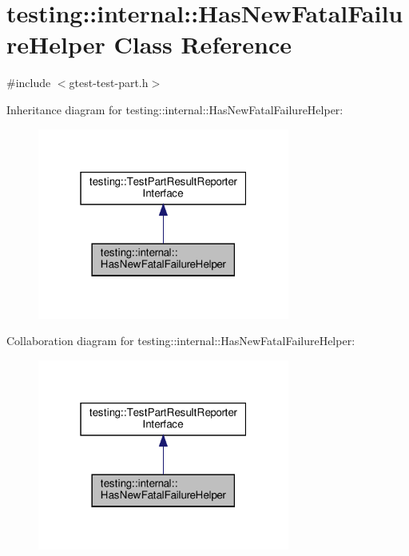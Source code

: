 \hypertarget{classtesting_1_1internal_1_1_has_new_fatal_failure_helper}{}\section{testing\+:\+:internal\+:\+:Has\+New\+Fatal\+Failure\+Helper Class Reference}
\label{classtesting_1_1internal_1_1_has_new_fatal_failure_helper}


{\ttfamily \#include $<$gtest-\/test-\/part.\+h$>$}



Inheritance diagram for testing\+:\+:internal\+:\+:Has\+New\+Fatal\+Failure\+Helper\+:
\nopagebreak
\begin{figure}[H]
\begin{center}
\leavevmode
\includegraphics[width=235pt]{classtesting_1_1internal_1_1_has_new_fatal_failure_helper__inherit__graph}
\end{center}
\end{figure}


Collaboration diagram for testing\+:\+:internal\+:\+:Has\+New\+Fatal\+Failure\+Helper\+:
\nopagebreak
\begin{figure}[H]
\begin{center}
\leavevmode
\includegraphics[width=235pt]{classtesting_1_1internal_1_1_has_new_fatal_failure_helper__coll__graph}
\end{center}
\end{figure}
